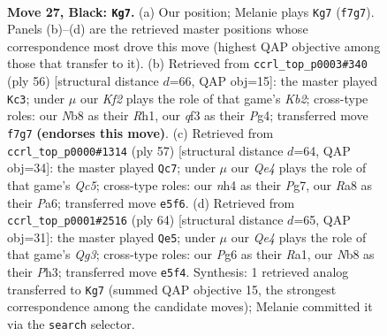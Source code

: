 \documentclass[11pt]{article}
\begin{document}
\clearpage

\begin{figure}[p]\centering
\begin{subfigure}{0.46\textwidth}\centering
\resizebox{\linewidth}{!}{%
\newchessgame
\chessboard[
  setfen={rnb5/p4k2/2p1p1p1/P1Ppq1P1/1P5N/2P2Q2/5K2/R1B5 b - - 1 27},
  showmover=false,
  pgfstyle=straightmove, color=movearrow, markmove={f7-g7}
]}
\caption{}
\end{subfigure}\hfill
\begin{subfigure}{0.46\textwidth}\centering
\resizebox{\linewidth}{!}{%
\newchessgame
\chessboard[
  setfen={3rb1k1/p3p2p/2pq1pp1/2N4P/2P3P1/1P2QP2/PK6/7R w - - 2 29},
  showmover=false,
  pgfstyle=straightmove, color=movearrow, markmove={b2-c3}
]}
\caption{}
\end{subfigure}
\\[4pt]
\begin{subfigure}{0.46\textwidth}\centering
\resizebox{\linewidth}{!}{%
\newchessgame
\chessboard[
  setfen={6k1/6pp/p2rp1b1/1p2p1P1/2q1P1B1/P4P2/1PP4Q/1K5R b - - 9 29},
  showmover=false,
  pgfstyle=straightmove, color=movearrow, markmove={c4-c7}
]}
\caption{}
\end{subfigure}\hfill
\begin{subfigure}{0.46\textwidth}\centering
\resizebox{\linewidth}{!}{%
\newchessgame
\chessboard[
  setfen={4r1k1/4qpp1/1pp1b2p/7B/1P1Pp3/4P1QP/5PP1/R5K1 w - - 1 33},
  showmover=false,
  pgfstyle=straightmove, color=movearrow, markmove={g3-e5}
]}
\caption{}
\end{subfigure}
\caption{\textbf{Move 27, Black: \texttt{Kg7}.} (a) Our position; Melanie plays \texttt{Kg7} (\texttt{f7g7}). Panels (b)--(d) are the retrieved master positions whose correspondence most drove this move (highest QAP objective among those that transfer to it). (b) Retrieved from \texttt{ccrl\_top\_p0003\#340} (ply 56) [structural distance $d$=66, QAP obj=15]: the master played \texttt{Kc3}; under $\mu$ our \emph{Kf2} plays the role of that game's \emph{Kb2}; cross-type roles: our \emph{N}b8 as their \emph{R}h1, our \emph{q}f3 as their \emph{P}g4; transferred move \texttt{f7g7} \textbf{(endorses this move)}. (c) Retrieved from \texttt{ccrl\_top\_p0000\#1314} (ply 57) [structural distance $d$=64, QAP obj=34]: the master played \texttt{Qc7}; under $\mu$ our \emph{Qe4} plays the role of that game's \emph{Qc5}; cross-type roles: our \emph{n}h4 as their \emph{P}g7, our \emph{R}a8 as their \emph{P}a6; transferred move \texttt{e5f6}. (d) Retrieved from \texttt{ccrl\_top\_p0001\#2516} (ply 64) [structural distance $d$=65, QAP obj=31]: the master played \texttt{Qe5}; under $\mu$ our \emph{Qe4} plays the role of that game's \emph{Qg3}; cross-type roles: our \emph{P}g6 as their \emph{R}a1, our \emph{N}b8 as their \emph{P}h3; transferred move \texttt{e5f4}. Synthesis: 1 retrieved analog transferred to \texttt{Kg7} (summed QAP objective 15, the strongest correspondence among the candidate moves); Melanie committed it via the \texttt{search} selector.}
\label{fig:thought-m53}
\end{figure}
\end{document}
